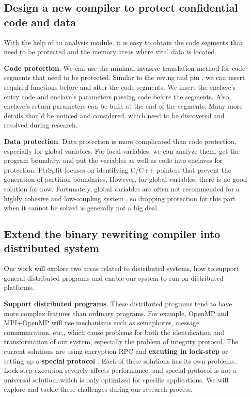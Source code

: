 \subsection{Design a new compiler to protect confidential code and data}
\label{sec:ToolToRewrite}
With the help of an analysis module, it is easy to obtain the code segments that need
to be protected and the memory areas where vital data is located.

\textbf{Code protection}. We can use the minimal-invasive translation method for
code segments that need to be protected. Similar to the rev.ng \cite{Federico2017revngAU}
and pin \cite{Luk2005PinBC}, we can insert required functions before and
after the code segments. We insert the enclave's entry code and enclave's parameters passing code
before the segments. Also, enclave's return parameters can be built at the end of the segments.
Many more details should be noticed and considered, which need to be
discovered and resolved during research.

\textbf{Data protection}. Data protection is more complicated than code protection,
especially for global variables.
For local variables, we can analyze them, get the program boundary,
and put the variables as well as code into enclaves for protection.
PtrSplit \cite{Liu2017PtrSplitSG} focuses on identifying C/C++ pointers
that prevent the generation of partition boundaries.
However, for global variables, there is no good solution for now. Fortunately,
global variables are often not recommended for a highly cohesive and low-coupling system
\cite{GlobalVariablesAreBad, GlobalVariablesAreEvil},
so dropping protection for this part when it cannot be solved is generally not a big deal.

\subsection{Extend the binary rewriting compiler into distributed system}
\label{sec:ToolToDistributedSystem}
Our work will explore two areas related to distributed systems, how to support general distributed
programs and enable our system to run on distributed platforms.

\textbf{Support distributed programs}.
These distributed programs tend to have more complex features than ordinary programs.
For example, OpenMP \cite{Dagum1998OpenMPAI} and MPI+OpenMP \cite{Klinkenberg2020CHAMELEONRL}
will use mechanisms such as semaphores, message communication, etc., which cause problems
for both the identification and transformation of our system, especially the problem of integrity protocol.
The current solutions are using encryption RPC and \textbf{excuting in lock-step} \cite{Shinde2017PanoplyLL}
or setting up a \textbf{special protocol} \cite{Schuster2015VC3TD, Priebe2018EnclaveDBAS}.
Each of these solutions has its own problems. Lock-step execution severely affects performance,
and special protocol is not a universal solution, which is only optimized for specific applications.
We will explore and tackle these challenges during our research process.

